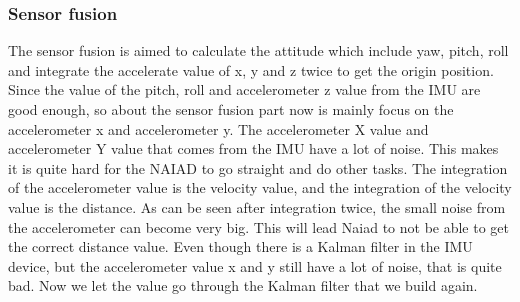 		\subsubsection{Sensor fusion} %
		\noindent

		The sensor fusion is aimed to calculate the attitude which include yaw, pitch, roll and integrate the accelerate value of x, y and z twice to get the origin position. Since the value of the pitch, roll and accelerometer z value from the IMU are good enough, so about the sensor fusion part now is mainly focus on the accelerometer x and accelerometer y.
	The accelerometer X value and accelerometer Y value that comes from the IMU have a lot of noise. This makes it is quite hard for the NAIAD to go straight and do other tasks. The integration of the accelerometer value is the velocity value, and the integration of the velocity value is the distance. As can be seen after integration twice, the small noise from the accelerometer can become very big. This will lead Naiad to not be able to get the correct distance value. Even though there is a Kalman filter in the IMU device, but the accelerometer value x and y still have a lot of noise, that is quite bad. Now we let the value go through the Kalman filter that we build again.
